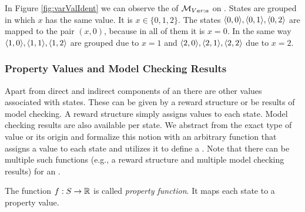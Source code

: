 \documentclass[preview]{standalone}
\begin{document}
\pagebreak

\begin{exmp}
	In Figure \ref{fig:varValIdent} we can observe the \viewN of ${{{{{\mathcal{M}}}}_{{Var:{a}}}}}$ on \chgph. States are grouped in which $x$ has the same value. It is $x \in \{0, 1, 2\}$. The states ${\langle0,0\rangle}, {\langle0,1\rangle},{\langle0,2\rangle}$ are mapped to the pair $(x,0)$, because in all of them it is $x=0$. In the same way ${\langle1,0\rangle}, {\langle1,1\rangle},{\langle1,2\rangle}$ are grouped due to $x=1$ and ${\langle2,0\rangle}, {\langle2,1\rangle},{\langle2,2\rangle}$ due to $x=2$.
\end{exmp}
\subsubsection{Property Values and Model Checking Results}
Apart from direct and indirect components of an \mdpN there are other values associated with states. These can be given by a reward structure or be results of model checking. A reward structure simply assigns values to each state. Model checking results are also available per state. 
We abstract from the exact type of value or its origin and formalize this notion with an arbitrary function that assigns a value to each state and utilizes it to define a \viewN. Note that there can be multiple such functions (e.g., a reward structure and multiple model checking results) for an \chgphN.

\begin{definition}
	The function ${f} : {S} \to {\mathbb{R}}$ is called \emph{property function}. It maps each state to a property value.
\end{definition}
\end{document}
